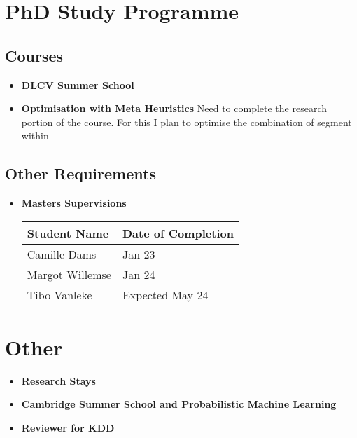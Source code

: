 \section{PhD Study Programme}

\subsection{Courses}

\begin{itemize}
    \item \textbf{DLCV Summer School}
    \item \textbf{Optimisation with Meta Heuristics}
    Need to complete the research portion of the course.
    For this I plan to optimise the combination of segment within 
\end{itemize}

\subsection{Other Requirements}

\begin{itemize}
    \item \textbf{Masters Supervisions}
    \begin{table}[h]
    \begin{tabular}{|l|l|}
        \hline
        \textbf{Student Name} & \textbf{Date of Completion} \\ \hline
        Camille Dams & Jan 23 \\ \hline
        Margot Willemse & Jan 24 \\ \hline
        Tibo Vanleke & Expected May 24\\ \hline
    \end{tabular}
\end{table}
\end{itemize}

\section{Other}

\begin{itemize}
    \item \textbf{Research Stays}
    \item \textbf{Cambridge Summer School and Probabilistic Machine Learning}
    \item \textbf{Reviewer for KDD}
\end{itemize}



